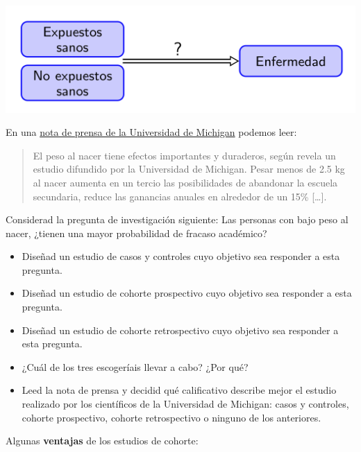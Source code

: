 \documentclass[
]{book}
\theoremstyle{definition}
\theoremstyle{definition}
\theoremstyle{definition}
\theoremstyle{definition}
\theoremstyle{remark}
\begin{document}
\begin{center}\includegraphics[width=0.8\linewidth]{INREMDN_files/figure-html/Coh} \end{center}

\begin{rmdexercici}
En una \href{http://ns.umich.edu/new/releases/5882}{nota de prensa de la Universidad de Michigan} podemos leer:

\begin{quote}
El peso al nacer tiene efectos importantes y duraderos, según revela un estudio difundido por la Universidad de Michigan. Pesar menos de 2.5 kg al nacer aumenta en un tercio las posibilidades de abandonar la escuela secundaria, reduce las ganancias anuales en alrededor de un 15\% {[}\ldots{]}.
\end{quote}

Considerad la pregunta de investigación siguiente: Las personas con bajo peso al nacer, ¿tienen una mayor probabilidad de fracaso académico?

\begin{itemize}
\item
  Diseñad un estudio de casos y controles cuyo objetivo sea responder a esta pregunta.
\item
  Diseñad un estudio de cohorte prospectivo cuyo objetivo sea responder a esta pregunta.
\item
  Diseñad un estudio de cohorte retrospectivo cuyo objetivo sea responder a esta pregunta.
\item
  ¿Cuál de los tres escogeríais llevar a cabo? ¿Por qué?
\item
  Leed la nota de prensa y decidid qué calificativo describe mejor el estudio realizado por los científicos de la Universidad de Michigan: casos y controles, cohorte prospectivo, cohorte retrospectivo o ninguno de los anteriores.
\end{itemize}
\end{rmdexercici}

Algunas \textbf{ventajas} de los estudios de cohorte:
\end{document}
